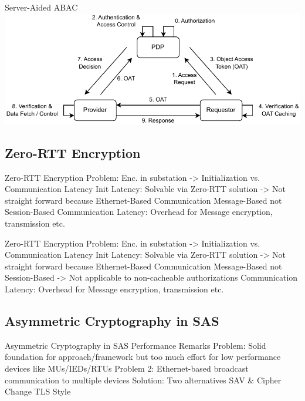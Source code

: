 \documentclass[en]{sdqbeamer}
\begin{document}
\begin{frame}{Server-Aided ABAC}
    \centering
    \includegraphics[width=1.0\textwidth]{./figures/access_control_request_delegation.drawio.pdf}
\end{frame}

\subsection{Zero-RTT Encryption}
\begin{frame}{Zero-RTT Encryption}
    Problem: Enc. in substation -> Initialization vs. Communication Latency
    Init Latency: Solvable via Zero-RTT solution -> Not straight forward because Ethernet-Based Communication Message-Based not Session-Based
    Communication Latency: Overhead for Message encryption, transmission etc.
\end{frame}

\begin{frame}{Zero-RTT Encryption}
    Problem: Enc. in substation -> Initialization vs. Communication Latency
    Init Latency: Solvable via Zero-RTT solution -> Not straight forward because Ethernet-Based Communication Message-Based not Session-Based
    -> Not applicable to non-cacheable authorizations
    Communication Latency: Overhead for Message encryption, transmission etc.
\end{frame}

\subsection{Asymmetric Cryptography in SAS}
\begin{frame}{Asymmetric Cryptography in SAS}
    Performance Remarks
    Problem: Solid foundation for approach/framework but too much effort for low performance devices like MUs/IEDs/RTUs
    Problem 2: Ethernet-based broadcast communication to multiple devices
    Solution: Two alternatives SAV \& Cipher Change TLS Style
\end{frame}
\end{document}
